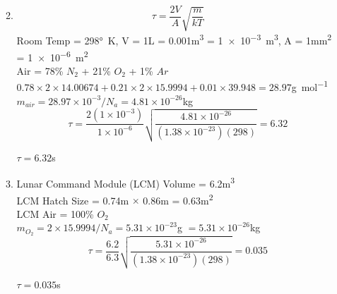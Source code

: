 \documentclass{article}
\begin{document}
\begin{enumerate}
\begin{enumerate}
\begin{equation*}
            \end{equation*}
        \vspace{0.05in}
        \item
            \begin{equation*}
                \tau = \frac{2V}{A} \sqrt{\frac{m}{kT}}
            \end{equation*}
            Room Temp = 298\si{\degree\kelvin}, V = 1\si{\liter} = 0.001\si{\cubic\metre} = \SI{1e-3}{\cubic\metre}, A = 1\si{\square\milli\metre} = \SI{1e-6}{\square\metre} \\
            Air = 78\% \(N_2\) + 21\% \(O_2\) + 1\% \(Ar\) \\
            \(0.78 \times 2 \times 14.00674 + 0.21 \times 2 \times 15.9994 + 0.01 \times 39.948 = 28.97\)\si{\gram\per\mole} \\
            \(m_{air} = 28.97 \times 10^{-3}/N_a = 4.81 \times 10^{-26}\)\si{\kilo\gram}
            \begin{equation*}
                \tau = \frac{2 \left(1 \times 10^{-3} \right)}{1 \times 10^{-6}} \sqrt{\frac{4.81 \times 10^{-26}}{\left(1.38 \times 10^{-23} \right)(298)}} = 6.32
            \end{equation*}
            \begin{center}
            \(\tau = 6.32\)\si{\second}
            \end{center}
        \vspace{0.05in}
        \item
            Lunar Command Module (LCM) Volume = 6.2\si{\cubic\metre} \\
            LCM Hatch Size = 0.74\si{\metre} \(\times\) 0.86\si{\metre} = 0.63\si{\square\metre} \\
            LCM Air = 100\% \(O_2\) \\
            \(m_{O_2} = 2 \times 15.9994 / N_a = 5.31 \times 10^{-23}\)\si{\gram} \(= 5.31 \times 10^{-26}\)\si{\kilo\gram}
            \begin{equation*}
                \tau = \frac{6.2}{6.3} \sqrt{\frac{5.31 \times 10^{-26}}{\left(1.38 \times 10^{-23} \right)(298)}} = 0.035
            \end{equation*}
            \begin{center}
                \(\tau = 0.035\)\si{\second}
            \end{center}

\end{enumerate}
\end{enumerate}
\end{document}
